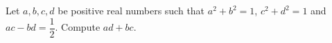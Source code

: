 Let $a,b,c,d$ be positive real numbers such that $a^2+b^2=1$, $c^2+d^2=1$ and $ac-bd=\dfrac12$. Compute $ad+bc$.
